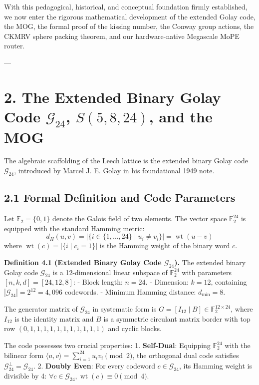 \documentclass[11pt,twoside,openright]{amsbook}
\begin{document}
With this pedagogical, historical, and conceptual foundation firmly established, we now enter the rigorous mathematical development of the extended Golay code, the MOG, the formal proof of the kissing number, the Conway group actions, the CKMRV sphere packing theorem, and our hardware-native Megascale MoPE router.

---

\section{2. The Extended Binary Golay Code $\mathcal{G}_{24}$, $S(5, 8, 24)$, and the MOG}

The algebraic scaffolding of the Leech lattice is the extended binary Golay code $\mathcal{G}_{24}$, introduced by Marcel J. E. Golay in his foundational 1949 note.

\subsection{2.1 Formal Definition and Code Parameters}

Let $\mathbb{F}_2 = \{0, 1\}$ denote the Galois field of two elements. The vector space $\mathbb{F}_2^{24}$ is equipped with the standard Hamming metric:
$$d_H(u, v) = |\{i \in \{1, \dots, 24\} \mid u_i \ne v_i\}| = \operatorname{wt}(u - v)$$
where $\operatorname{wt}(c) = |\{i \mid c_i = 1\}|$ is the Hamming weight of the binary word $c$.

\textbf{Definition 4.1 (Extended Binary Golay Code $\mathcal{G}_{24}$).}
The extended binary Golay code $\mathcal{G}_{24}$ is a 12-dimensional linear subspace of $\mathbb{F}_2^{24}$ with parameters $[n, k, d] = [24, 12, 8]$:
- Block length: $n = 24$.
- Dimension: $k = 12$, containing $|\mathcal{G}_{24}| = 2^{12} = 4,096$ codewords.
- Minimum Hamming distance: $d_{\min} = 8$.

The generator matrix of $\mathcal{G}_{24}$ in systematic form is $G = [I_{12} \mid B] \in \mathbb{F}_2^{12 \times 24}$, where $I_{12}$ is the identity matrix and $B$ is a symmetric circulant matrix border with top row $(0, 1, 1, 1, 1, 1, 1, 1, 1, 1, 1, 1)$ and cyclic blocks.

The code possesses two crucial properties:
1. \textbf{Self-Dual}: Equipping $\mathbb{F}_2^{24}$ with the bilinear form $\langle u, v \rangle = \sum_{i=1}^{24} u_i v_i \pmod 2$, the orthogonal dual code satisfies $\mathcal{G}_{24}^\perp = \mathcal{G}_{24}$.
2. \textbf{Doubly Even}: For every codeword $c \in \mathcal{G}_{24}$, its Hamming weight is divisible by 4: $\forall c \in \mathcal{G}_{24}, \operatorname{wt}(c) \equiv 0 \pmod 4$.
\end{document}
